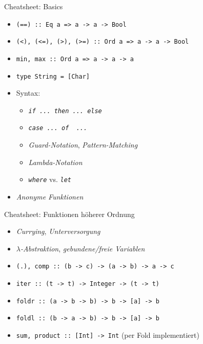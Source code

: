 \documentclass{beamer}
\begin{document}
\begin{frame}{Cheatsheet: Basics}
	\begin{itemize}
          \item \texttt{(==) :: Eq a => a -> a -> Bool}
          \item \texttt{(<), (<=), (>), (>=) :: Ord a => a -> a -> Bool}
          \item \texttt{min, max :: Ord a => a -> a -> a}
          \item \texttt{type String = [Char]}
          \item Syntax:
          \begin{itemize}
            \item \emph{\texttt{if ... then ... else}}
            \item \emph{\texttt{case ... of { ... }}}
            \item \emph{Guard-Notation}, \emph{Pattern-Matching}
            \item \emph{Lambda-Notation}
            \item \emph{\texttt{where}} vs. \emph{\texttt{let}}
          \end{itemize}
          \item \emph{Anonyme Funktionen}
	\end{itemize}
\end{frame}

\begin{frame}{Cheatsheet: Funktionen höherer Ordnung}
	\begin{itemize}
          \item \emph{Currying}, \emph{Unterversorgung}
          \item \emph{$\lambda$-Abstraktion}, \emph{gebundene/freie Variablen}
          \item \texttt{(.), comp :: (b -> c) -> (a -> b) -> a -> c}
          \item \texttt{iter :: (t -> t) -> Integer -> (t -> t)}
          \item \texttt{foldr :: (a -> b -> b) -> b -> [a] -> b}
          \item \texttt{foldl :: (b -> a -> b) -> b -> [a] -> b}
          \item \texttt{sum, product :: [Int] -> Int} (per Fold implementiert)
	\end{itemize}
\end{frame}
\end{document}
